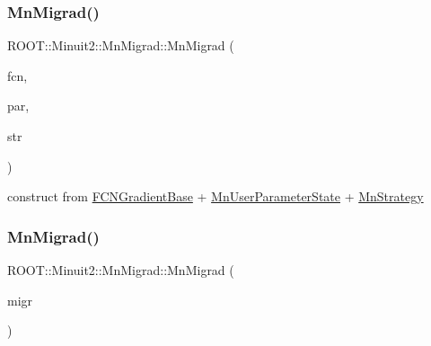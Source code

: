 \subsubsection{\texorpdfstring{MnMigrad()}{MnMigrad()}\hspace{0.1cm}{\footnotesize\ttfamily [12/39]}}
{\footnotesize\ttfamily R\+O\+O\+T\+::\+Minuit2\+::\+Mn\+Migrad\+::\+Mn\+Migrad (\begin{DoxyParamCaption}\item[{const \mbox{\hyperlink{classROOT_1_1Minuit2_1_1FCNGradientBase}{F\+C\+N\+Gradient\+Base}} \&}]{fcn,  }\item[{const \mbox{\hyperlink{classROOT_1_1Minuit2_1_1MnUserParameterState}{Mn\+User\+Parameter\+State}} \&}]{par,  }\item[{const \mbox{\hyperlink{classROOT_1_1Minuit2_1_1MnStrategy}{Mn\+Strategy}} \&}]{str }\end{DoxyParamCaption})\hspace{0.3cm}{\ttfamily [inline]}}



construct from \mbox{\hyperlink{classROOT_1_1Minuit2_1_1FCNGradientBase}{F\+C\+N\+Gradient\+Base}} + \mbox{\hyperlink{classROOT_1_1Minuit2_1_1MnUserParameterState}{Mn\+User\+Parameter\+State}} + \mbox{\hyperlink{classROOT_1_1Minuit2_1_1MnStrategy}{Mn\+Strategy}} 

\mbox{\label{classROOT_1_1Minuit2_1_1MnMigrad_a992fa22c62be692f5cd8f781c73475e0}} 
\subsubsection{\texorpdfstring{MnMigrad()}{MnMigrad()}\hspace{0.1cm}{\footnotesize\ttfamily [13/39]}}
{\footnotesize\ttfamily R\+O\+O\+T\+::\+Minuit2\+::\+Mn\+Migrad\+::\+Mn\+Migrad (\begin{DoxyParamCaption}\item[{const \mbox{\hyperlink{classROOT_1_1Minuit2_1_1MnMigrad}{Mn\+Migrad}} \&}]{migr }\end{DoxyParamCaption})\hspace{0.3cm}{\ttfamily [inline]}}

\mbox{\label{classROOT_1_1Minuit2_1_1MnMigrad_a7a415c2b0378cf8f4606e53b7d20ae63}} 
